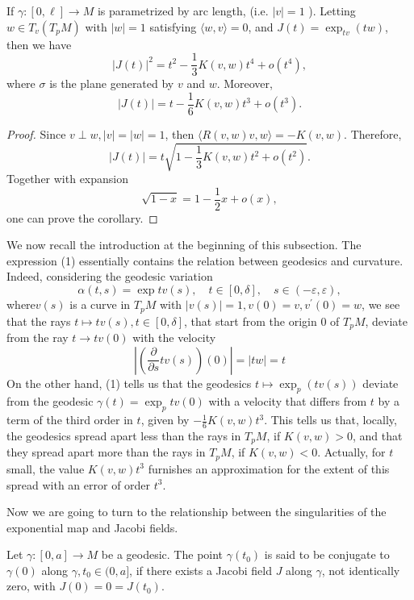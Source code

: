 \documentclass{ctexart}
\begin{document}
\begin{corollary}
  If $\gamma:[0, \ell] \rightarrow M$ is parametrized by arc length, (i.e. $|v|=1$ ). Letting $w \in T_v\left(T_p M\right)$ with $|w|=1$ satisfying $\langle w, v\rangle=0$, 
  and $J(t)=\exp_{t v}(t w)$, then we have 
  $$
  |J(t)|^2=t^2-\frac{1}{3} K(v, w) t^4+o(t^4), 
  $$
  where $\sigma$ is the plane generated by $v$ and $w$. Moreover, 
  \begin{equation}
    |J(t)|=t-\frac{1}{6} K(v, w) t^3+o(t^3). 
  \end{equation}
\end{corollary}
\begin{proof}[Proof]
  Since $v \perp w,|v|=|w|=1$, then $\langle R(v, w) v, w\rangle=-K(v, w)$. Therefore, 
  $$
  |J(t)|=t \sqrt{1-\frac{1}{3} K(v, w) t^2+o\left(t^2\right)} .
  $$
  Together with expansion
  $$
  \sqrt{1-x}=1-\frac{1}{2} x+o(x),
  $$
  one can prove the corollary. 
\end{proof}

We now recall the introduction at the beginning of this subsection. The expression (1) essentially contains the relation between geodesics and curvature. 
Indeed, considering the geodesic variation
$$
\alpha(t, s)=\exp t v(s), \quad t \in[0, \delta], \quad s \in(-\varepsilon, \varepsilon),
$$
where$v(s)$ is a curve in $T_p M$ with $|v(s)|=1, v(0)=v, v^{\prime}(0)=w$, we see that 
the rays $t \mapsto t v(s), t \in[0, \delta]$, that start from the origin 0 of $T_p M$, deviate from the ray $t \rightarrow t v(0)$ with the velocity
$$
\left|\left(\frac{\partial}{\partial s} t v(s)\right)(0)\right|=|t w|=t
$$
On the other hand, (1) tells us that the geodesics $t \mapsto \exp _p(t v(s))$ deviate from the geodesic $\gamma(t)=\exp _p t v(0)$ 
with a velocity that differs from $t$ by a term of the third order in $t$, given by $-\frac{1}{6} K(v, w) t^3$. This tells us that, locally, 
the geodesics spread apart less than the rays in $T_p M$, if $K(v, w)>0$, and that they spread apart more than the rays in $T_p M$, if $K(v, w)<0$. 
Actually, for $t$ small, the value $K(v, w) t^3$ furnishes an approximation for the extent of this spread with an error of order $t^3$.

Now we are going to turn to the relationship between the singularities of the exponential map and Jacobi fields. 
\begin{definition}
  Let $\gamma:[0, a] \rightarrow M$ be a geodesic. The point $\gamma\left(t_0\right)$ is said to be conjugate to $\gamma(0)$ along $\gamma, t_0 \in(0, a]$, 
  if there exists a Jacobi field $J$ along $\gamma$, not identically zero, with $J(0)=0=J\left(t_0\right)$. 
\end{definition}
\end{document}

